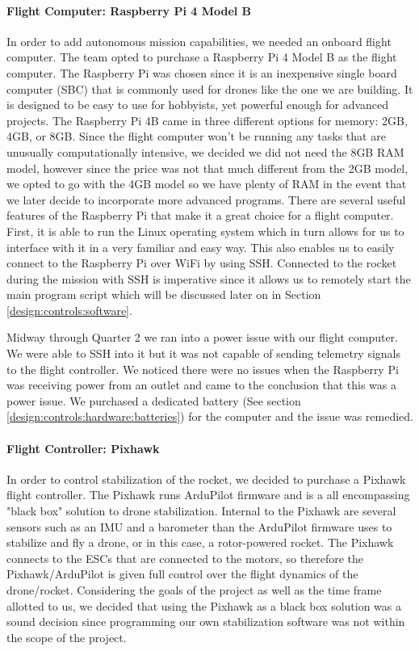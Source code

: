 \paragraph{Flight Computer: Raspberry Pi 4 Model B}
In order to add autonomous mission capabilities, we needed an onboard flight computer. The team opted to purchase a Raspberry Pi 4 Model B as the flight computer. The Raspberry Pi was chosen since it is an inexpensive single board computer (SBC) that is commonly used for drones like the one we are building. It is designed to be easy to use for hobbyists, yet powerful enough for advanced projects. The Raspberry Pi 4B came in three different options for memory: 2GB, 4GB, or 8GB. Since the flight computer won't be running any tasks that are unusually computationally intensive, we decided we did not need the 8GB RAM model, however since the price was not that much different from the 2GB model, we opted to go with the 4GB model so we have plenty of RAM in the event that we later decide to incorporate more advanced programs. There are several useful features of the Raspberry Pi that make it a great choice for a flight computer. First, it is able to run the Linux operating system which in turn allows for us to interface with it in a very familiar and easy way. This also enables us to easily connect to the Raspberry Pi over WiFi by using SSH. Connected to the rocket during the mission with SSH is imperative since it allows us to remotely start the main program script which will be discussed later on in Section \ref{design:controls:software}.

Midway through Quarter 2 we ran into a power issue with our flight computer. We were able to SSH into it but it was not capable of sending telemetry signals to the flight controller. We noticed there were no issues when the Raspberry Pi was receiving power from an outlet and came to the conclusion that this was a power issue. We purchased a dedicated battery (See section \ref{design:controls:hardware:batteries}) for the computer and the issue was remedied. 

\paragraph{Flight Controller: Pixhawk} 
In order to control stabilization of the rocket, we decided to purchase a Pixhawk flight controller. The Pixhawk runs ArduPilot firmware and is a all encompassing "black box" solution to drone stabilization. Internal to the Pixhawk are several sensors such as an IMU and a barometer than the ArduPilot firmware uses to stabilize and fly a drone, or in this case, a rotor-powered rocket. The Pixhawk connects to the ESCs that are connected to the motors, so therefore the Pixhawk/ArduPilot is given full control over the flight dynamics of the drone/rocket. Considering the goals of the project as well as the time frame allotted to us, we decided that using the Pixhawk as a black box solution was a sound decision since programming our own stabilization software was not within the scope of the project.

